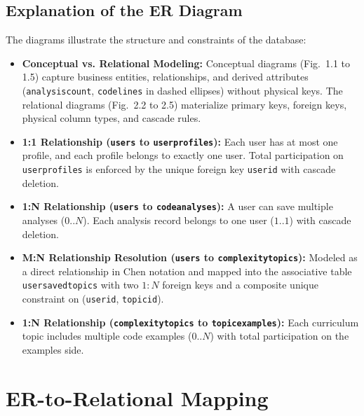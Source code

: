 \documentclass[12pt,a4paper]{report}
\DeclareRobustCommand{\_}{\textunderscore\allowbreak}
\begin{document}
\clearpage

\section{Explanation of the ER Diagram}
\renewcommand{\thefigure}{\thechapter.\arabic{figure}}
The diagrams illustrate the structure and constraints of the database:
\begin{itemize}
    \item \textbf{Conceptual vs. Relational Modeling:} Conceptual diagrams (Fig.~1.1 to 1.5) capture business entities, relationships, and derived attributes (\texttt{analysis\_count}, \texttt{code\_lines} in dashed ellipses) without physical keys. The relational diagrams (Fig.~2.2 to 2.5) materialize primary keys, foreign keys, physical column types, and cascade rules.
    \item \textbf{1:1 Relationship (\texttt{users} to \texttt{user\_profiles}):} Each user has at most one profile, and each profile belongs to exactly one user. Total participation on \texttt{user\_profiles} is enforced by the unique foreign key \texttt{user\_id} with cascade deletion.
    \item \textbf{1:N Relationship (\texttt{users} to \texttt{code\_analyses}):} A user can save multiple analyses ($0..N$). Each analysis record belongs to one user ($1..1$) with cascade deletion.
    \item \textbf{M:N Relationship Resolution (\texttt{users} to \texttt{complexity\_topics}):} Modeled as a direct relationship in Chen notation and mapped into the associative table \texttt{user\_saved\_topics} with two $1:N$ foreign keys and a composite unique constraint on (\texttt{user\_id}, \texttt{topic\_id}).
    \item \textbf{1:N Relationship (\texttt{complexity\_topics} to \texttt{topic\_examples}):} Each curriculum topic includes multiple code examples ($0..N$) with total participation on the examples side.
\end{itemize}

\chapter{ER-to-Relational Mapping}
\end{document}
